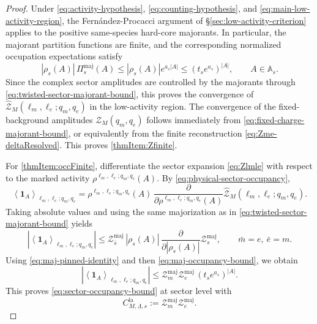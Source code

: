 \documentclass[dvipsnames,a4paper]{article}
\numberwithin{equation}{section}
\theoremstyle{definition}
\theoremstyle{remark}
\begin{document}
\begin{proof}
	Under \eqref{eq:activity-hypothesis}, \eqref{eq:counting-hypothesis}, and
	\eqref{eq:main-low-activity-region}, the Fernández-Procacci argument of
	\S\ref{sec:low-activity-criterion} applies to the positive same-species hard-core
	majorants. In particular, the majorant partition functions are finite, and the
	corresponding normalized occupation expectations satisfy
	\begin{equation}
		|\rho_s(A)|\,\Pi_s^{\mathrm{maj}}(A)
		\le
		|\rho_s(A)|e^{a_s|A|}
		\le
		(t_s e^{a_s})^{|A|},
		\qquad
		A\in\mathbb A_s.
		\label{eq:maj-occupancy-bound}
	\end{equation}
	Since the complex sector amplitudes are controlled by the majorants through
	\eqref{eq:twisted-sector-majorant-bound}, this proves the convergence of
	\(\widehat{\mathcal Z}_M(\ell_m,\ell_e;q_m,q_e)\) in the low-activity region. The
	convergence of the fixed-background amplitudes \(\mathcal Z_M(q_m,q_e)\) follows
	immediately from \eqref{eq:fixed-charge-majorant-bound}, or equivalently from the
	finite reconstruction \eqref{eq:Zme-deltaResolved}. This proves
	\ref{thmItem:Zfinite}.
	
	For \ref{thmItem:occFinite}, differentiate the sector expansion \eqref{eq:Zlmle} with
	respect to the marked activity \(\rho^{\ell_m,\ell_e;q_m,q_e}(A)\). By
	\eqref{eq:physical-sector-occupancy},
	\begin{equation}
		\left\langle \mathbf 1_A \right\rangle_{\ell_m,\ell_e;q_m,q_e}
		=
		\rho^{\ell_m,\ell_e;q_m,q_e}(A)\,
		\frac{\partial}{\partial \rho^{\ell_m,\ell_e;q_m,q_e}(A)}
		\widehat{\mathcal Z}_M(\ell_m,\ell_e;q_m,q_e).
	\end{equation}
	Taking absolute values and using the same majorization as in
	\eqref{eq:twisted-sector-majorant-bound} yields
	\begin{equation}
		\left|
		\left\langle \mathbf 1_A \right\rangle_{\ell_m,\ell_e;q_m,q_e}
		\right|
		\le
		\mathcal Z_{\bar s}^{\mathrm{maj}}\,
		|\rho_s(A)|\,
		\frac{\partial}{\partial |\rho_s(A)|} \mathcal Z_s^{\mathrm{maj}},
		\qquad
		\bar m=e,\ \bar e=m.
	\end{equation}
	Using \eqref{eq:maj-pinned-identity} and then \eqref{eq:maj-occupancy-bound}, we obtain
	\begin{equation}
		\left|
		\left\langle \mathbf 1_A \right\rangle_{\ell_m,\ell_e;q_m,q_e}
		\right|
		\le
		\mathcal Z_m^{\mathrm{maj}}\mathcal Z_e^{\mathrm{maj}}\,
		(t_s e^{a_s})^{|A|}.
	\end{equation}
	This proves \eqref{eq:sector-occupancy-bound} at sector level with
	\begin{equation}
		C_{M,\underline\Lambda,s}^{\mathrm{la}}
		:=
		\mathcal Z_m^{\mathrm{maj}}\mathcal Z_e^{\mathrm{maj}}.
	\end{equation}
	

\end{proof}
\end{document}
